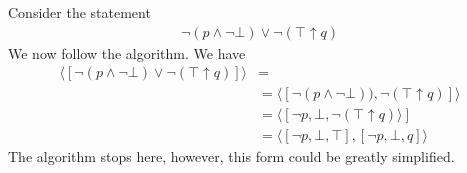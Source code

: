 \documentclass[a4paper]{article}
\theoremstyle{plain}
\theoremstyle{definition}
\newtheorem{exmp}{Example}[section]
\theoremstyle{remark}
\begin{document}
\begin{tcolorbox}[colback=black!3!white,colframe=black!60!white,title=\begin{exmp}CNF expansion algorithm \label{CNF exapnsion algorithm}\end{exmp}]
        Consider the statement
                \begin{align}
                \neg \left( p \land \neg \bot \right)  \lor \neg \left( \top \uparrow q \right) 
                \end{align}
	We now follow the algorithm. We have
	\begin{align}
		\langle[\neg \left( p \land \neg \bot \right)  \lor \neg \left( \top \uparrow q \right)]\rangle &= \\
&= \langle [ \neg \left( p \land \neg \bot \right) ),\neg \left( \top \uparrow q \right) ]\rangle \\
&= \langle[ \neg p, \bot , \neg\left( \top \uparrow q \right) \rangle] \\
&= \langle [ \neg p, \bot, \top],[\neg p, \bot, q ] \rangle
		\end{align}
		The algorithm stops here, however, this form could be greatly simplified.
\end{tcolorbox}
\end{document}
